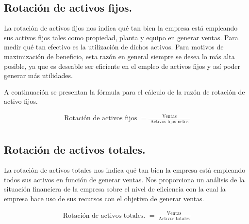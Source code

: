 \documentclass{article}
\begin{document}
\subsection{Rotación de activos fijos.}
La rotación de activos fijos nos indica qué tan bien la empresa está empleando sus activos fijos tales como propiedad, planta y equipo en generar ventas. Para medir qué tan efectivo es la utilización de dichos activos. Para motivos de maximización de beneficio, esta razón en general siempre se desea lo más alta posible, ya que es deseable ser eficiente en el empleo de activos fijos y así poder generar más utilidades. \par 
A continuación se presentan la fórmula para el cálculo de la razón de rotación de activo fijos.
\begin{center}
   \begin{align*}
       \text{ Rotación de activos fijos } = \frac{\text{ Ventas }}{\text{ Activos fijos netos }} \\
   \end{align*}
\end{center}

\subsection{Rotación de activos totales.}
La rotación de activos totales nos indica qué tan bien la empresa está empleando todos sus activos en función de generar ventas. Nos proporciona un análisis de la situación financiera de la empresa sobre el nivel de eficiencia con la cual la empresa hace uso de sus recursos con el objetivo de generar ventas.
\begin{center}
   \begin{align*}
       \text{ Rotación de activos totales. } = \frac{\text{ Ventas }}{\text{ Activos totales }} \\
   \end{align*}
\end{center}
\end{document}
